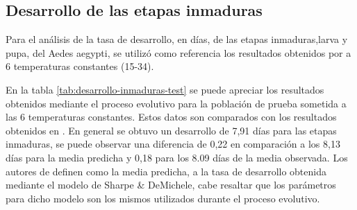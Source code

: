 
\subsection{Desarrollo de las etapas inmaduras}
Para el análisis de la tasa de desarrollo, en días, de las etapas inmaduras,larva y pupa, del Aedes
aegypti, se utilizó como referencia los resultados obtenidos por \cite{rueda1990temperature} a 6
temperaturas constantes (15-34\textcelsius).

En la tabla \ref{tab:desarrollo-inmaduras-test} se puede apreciar los resultados obtenidos mediante el
proceso evolutivo para la población de prueba sometida a las 6 temperaturas constantes. Estos datos son
comparados con los resultados obtenidos en \cite{rueda1990temperature}. En general se obtuvo un 
desarrollo de 7,91 días para las etapas inmaduras, se puede observar una diferencia de 0,22 en
comparación a los 8,13 días para la media predicha y 0,18 para los 8.09 días de la media observada. Los
autores de \cite{rueda1990temperature} definen como la media predicha, a la tasa de desarrollo obtenida
mediante el modelo de Sharpe \& DeMichele, cabe resaltar que los parámetros para dicho modelo son los
mismos utilizados durante el proceso evolutivo.

